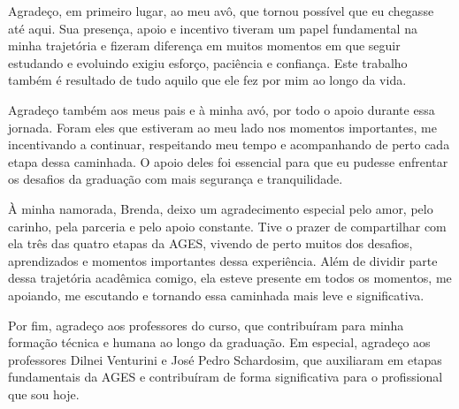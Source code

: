 \begin{agradecimentos}
  Agradeço, em primeiro lugar, ao meu avô, que tornou possível que eu chegasse até aqui.
  Sua presença, apoio e incentivo tiveram um papel fundamental na minha trajetória e
  fizeram diferença em muitos momentos em que seguir estudando e evoluindo exigiu
  esforço, paciência e confiança. Este trabalho também é resultado de tudo aquilo que
  ele fez por mim ao longo da vida.

  Agradeço também aos meus pais e à minha avó, por todo o apoio durante essa jornada.
  Foram eles que estiveram ao meu lado nos momentos importantes, me incentivando a
  continuar, respeitando meu tempo e acompanhando de perto cada etapa dessa caminhada.
  O apoio deles foi essencial para que eu pudesse enfrentar os desafios da graduação
  com mais segurança e tranquilidade.

  À minha namorada, Brenda, deixo um agradecimento especial pelo amor, pelo carinho, pela
  parceria e pelo apoio constante. Tive o prazer de compartilhar com ela três das
  quatro etapas da AGES, vivendo de perto muitos dos desafios, aprendizados e momentos
  importantes dessa experiência. Além de dividir parte dessa trajetória acadêmica
  comigo, ela esteve presente em todos os momentos, me apoiando, me escutando e
  tornando essa caminhada mais leve e significativa.

  Por fim, agradeço aos professores do curso, que contribuíram para minha formação
  técnica e humana ao longo da graduação. Em especial, agradeço aos professores
  Dilnei Venturini e José Pedro Schardosim, que auxiliaram em etapas fundamentais da AGES e
  contribuíram de forma significativa para o profissional que sou hoje.
\vfill
\end{agradecimentos}
